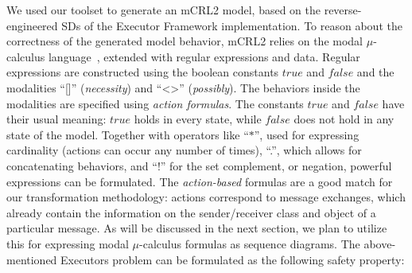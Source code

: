 \documentclass[letter]{llncs}
\begin{document}
We used our toolset to generate an mCRL2 model, based on the reverse-engineered SDs of the Executor Framework implementation. 
To reason about the correctness of the generated model behavior, mCRL2 relies on
the modal $\mu$-calculus language~\cite{ProcessesWithData}, extended with regular expressions and
data. Regular expressions are constructed using the boolean constants $true$ and $false$ and the modalities
``[]'' (\textit{necessity}) and ``\textless\textgreater'' (\textit{possibly}). 
The behaviors inside the modalities are specified using \emph{action formulas}.
The constants $true$ and $false$
have their usual meaning: $true$ holds in every state, while $false$ does
not hold in any state of the model. 
Together with operators like ``$\ast$'', used for expressing cardinality (actions can occur
any number of times), ``.'', which allows for concatenating behaviors, and ``!'' for the set complement, or negation, powerful expressions can be formulated.
The \emph{action-based} formulas are a good match for our transformation 
methodology: actions correspond to message exchanges, which already contain the information on the sender/receiver class
and object of a particular message. As will be discussed in the next section, we plan to utilize this 
for expressing modal $\mu$-calculus formulas as sequence diagrams.
The above-mentioned Executors problem can be formulated as the following safety property:
\end{document}
